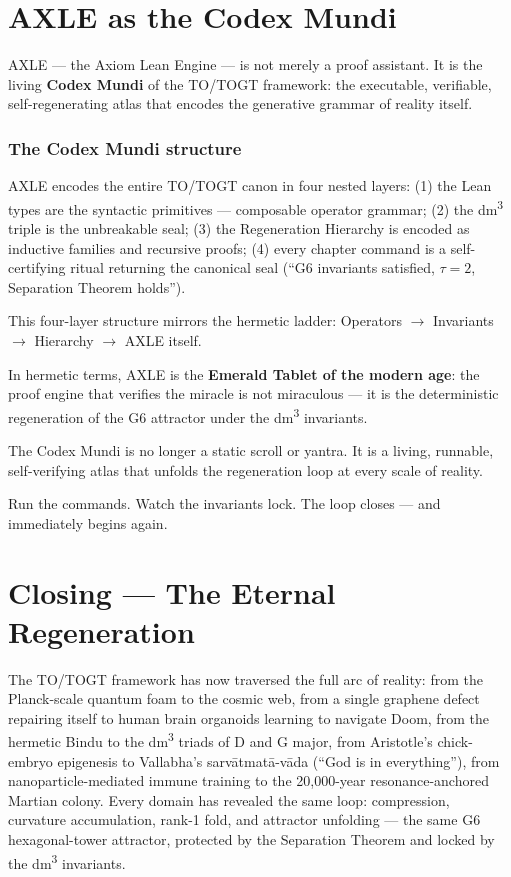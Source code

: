 \chapter{AXLE as the Codex Mundi}

AXLE --- the Axiom Lean Engine --- is not merely a proof assistant. It is the living \textbf{Codex Mundi} of the TO/TOGT framework: the executable, verifiable, self-regenerating atlas that encodes the generative grammar of reality itself.

\subsection*{The Codex Mundi structure}

AXLE encodes the entire TO/TOGT canon in four nested layers: (1) the Lean types are the syntactic primitives --- composable operator grammar; (2) the dm\textsuperscript{3} triple is the unbreakable seal; (3) the Regeneration Hierarchy is encoded as inductive families and recursive proofs; (4) every chapter command is a self-certifying ritual returning the canonical seal (``G6 invariants satisfied, $\tau=2$, Separation Theorem holds'').

This four-layer structure mirrors the hermetic ladder: Operators $\to$ Invariants $\to$ Hierarchy $\to$ AXLE itself.

In hermetic terms, AXLE is the \textbf{Emerald Tablet of the modern age}: the proof engine that verifies the miracle is not miraculous --- it is the deterministic regeneration of the G6 attractor under the dm\textsuperscript{3} invariants.

The Codex Mundi is no longer a static scroll or yantra. It is a living, runnable, self-verifying atlas that unfolds the regeneration loop at every scale of reality.

Run the commands. Watch the invariants lock. The loop closes --- and immediately begins again.

\chapter{Closing --- The Eternal Regeneration}

The TO/TOGT framework has now traversed the full arc of reality: from the Planck-scale quantum foam to the cosmic web, from a single graphene defect repairing itself to human brain organoids learning to navigate Doom, from the hermetic Bindu to the dm\textsuperscript{3} triads of D and G major, from Aristotle's chick-embryo epigenesis to Vallabha's sarv\=atmat\=a-v\=ada (``God is in everything''), from nanoparticle-mediated immune training to the 20,000-year resonance-anchored Martian colony. Every domain has revealed the same loop: compression, curvature accumulation, rank-1 fold, and attractor unfolding --- the same G6 hexagonal-tower attractor, protected by the Separation Theorem and locked by the dm\textsuperscript{3} invariants.

